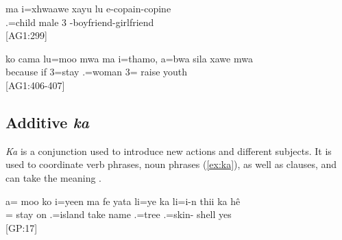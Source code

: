
\ea
\gll ma i=xhwaawe xayu lu e-copain-copine\\
  .=child male 3 -boyfriend-girlfriend\\
\glt {} {[AG1:299]}
\z

\ea
\gll ko cama lu=moo mwa ma i=thamo, a=bwa sila xawe mwa\\
 because if 3=stay   .=woman 3= raise youth \\
\glt {} {[AG1:406-407]}
\z

 \subsection{Additive \textit{ka} }
\textit{Ka} is a conjunction used to introduce new actions and different subjects. It is used to coordinate verb phrases, noun phrases (\ref{ex:ka}), as well as clauses, and can take the meaning .

\ea \label{ex:ka}
\gll a= moo ko i=yeen ma fe yata li=ye ka li=i-n thii ka hê \\ %
 = stay on .=island  take name .=tree  .=skin- shell  yes \\ %
\glt {} {[GP:17]}%
\z

